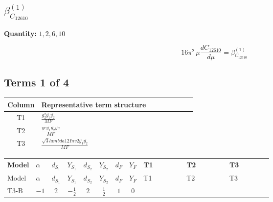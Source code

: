 \documentclass[8pt]{article}
\begin{document}
\begin{landscape}
\section*{$\beta_{C_{12610}}^{(1)}$}
\noindent\textbf{Quantity: }$\mathrm{1,2,6,10}$\par\smallskip
\[16\pi^2\,\mu\frac{d C_{12610}}{d\mu}=\beta_{C_{12610}}^{(1)}\]
\subsection*{Terms 1 of 4}
\begin{center}
\begin{tabular}{@{}c >{\raggedright\arraybackslash}p{0.82\linewidth}@{}}
\toprule
Column & Representative term structure \\
\midrule
T1 & \(\displaystyle \frac{g_{2}^{2} \overline{y_{1}} \overline{y_{2}}}{MF}\) \\
\midrule
T2 & \(\displaystyle \frac{ye \overline{y_{1}} \overline{y_{2}} \overline{ye}}{MF}\) \\
\midrule
T3 & \(\displaystyle \frac{\sqrt{3} lambda12Inv2 \overline{y_{1}} \overline{y_{2}}}{MF}\) \\
\midrule
\bottomrule
\end{tabular}
\end{center}
\smallskip
\tiny
\begin{longtable}{@{}llcccccc >{\raggedright\arraybackslash}p{0.21\linewidth} >{\raggedright\arraybackslash}p{0.21\linewidth} >{\raggedright\arraybackslash}p{0.21\linewidth}@{}}
\toprule
Model & $\alpha$ & $d_{S_1}$ & $Y_{S_1}$ & $d_{S_2}$ & $Y_{S_2}$ & $d_F$ & $Y_F$ & T1 & T2 & T3 \\
\midrule
\endfirsthead
\toprule
Model & $\alpha$ & $d_{S_1}$ & $Y_{S_1}$ & $d_{S_2}$ & $Y_{S_2}$ & $d_F$ & $Y_F$ & T1 & T2 & T3 \\
\midrule
\endhead
T3-B & $-1$ & $2$ & $-\frac{1}{2}$ & $2$ & $\frac{1}{2}$ & $1$ & $0$ & \scriptsize\adjustbox{max width=\linewidth}{$\begin{gathered} \frac{3 g_{2}^{2} \overline{y_{1}} \overline{y_{2}}}{8 MF}\end{gathered}$} & \scriptsize\adjustbox{max width=\linewidth}{$\begin{gathered} - \frac{ye \overline{y_{1}} \overline{y_{2}} \overline{ye}}{8 MF}\end{gathered}$} & \scriptsize\adjustbox{max width=\linewidth}{$\begin{gathered} \frac{\sqrt{3} lambda12Inv2 \overline{y_{1}} \overline{y_{2}}}{6 MF}\end{gathered}$} \\

\end{longtable}
\end{landscape}
\end{document}
